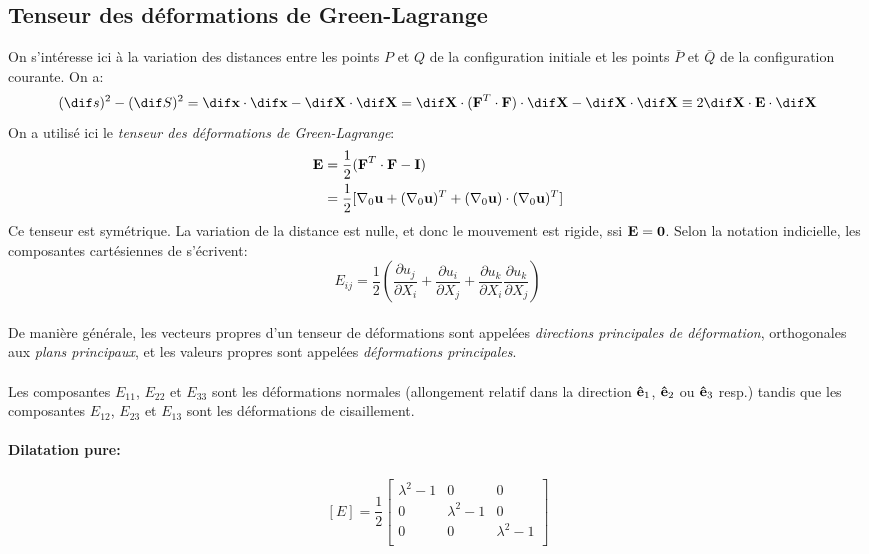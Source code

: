 \subsection{Tenseur des déformations de Green-Lagrange}
On s'intéresse ici à la variation des distances entre les points $P$ et $Q$ de la configuration initiale et les points $\bar{P}$ et $\bar{Q}$ de la configuration courante. On a:
$$(\dif s)^2-(\dif S)^2=\dif \fv{x}\cdot \dif \fv{x}-\dif \fv{X}\cdot \dif \fv{X}=\dif \fv{X}\cdot(\fv{F}^T\cdot\fv{F})\cdot \dif \fv{X}-\dif \fv{X}\cdot \dif \fv{X} \equiv 2\dif \fv{X}\cdot \fv{E} \cdot \dif \fv{X}$$
On a utilisé ici le \emph{tenseur des déformations de Green-Lagrange}:
$$\begin{aligned}
\textbf{E}&=\frac{1}{2}(\textbf{F}^T\cdot \textbf{F}-\textbf{I})\\
 &=\frac{1}{2}[\nabla_0\textbf{u}+(\nabla_0\textbf{u})^T + (\nabla_0\textbf{u})\cdot(\nabla_0\textbf{u})^T ]
 \end{aligned}
$$
Ce tenseur est symétrique. La variation de la distance est nulle, et donc le mouvement est rigide, ssi $\textbf{E}=\textbf{0}$.
Selon la notation indicielle, les composantes cartésiennes de  s'écrivent:
$$E_{ij}=\frac{1}{2}\left(\frac{\partial u_j}{\partial X_i}+\frac{\partial u_i}{\partial X_j}+\frac{\partial u_k}{\partial X_i}\frac{\partial u_k}{\partial X_j}\right)$$
\paragraph{}
De manière générale, les vecteurs propres d'un tenseur de déformations sont appelées \emph{directions principales de déformation}, orthogonales aux \emph{plans principaux}, et les valeurs propres sont appelées \emph{déformations principales}.
\paragraph{}
Les composantes $E_{11}$, $E_{22}$ et $E_{33}$ sont les déformations normales (allongement relatif dans la direction $\textbf{ê}_1$, $\textbf{ê}_2$ ou $\textbf{ê}_3$ resp.) tandis que les composantes $E_{12}$, $E_{23}$ et $E_{13}$ sont les déformations de cisaillement.
\paragraph{Dilatation pure:}
$$[E]=\frac{1}{2}
\left[\begin{array}{ccc}
\lambda^2-1&0&0\\
0&\lambda^2-1&0\\
0&0&\lambda^2-1\\
\end{array}\right]$$
